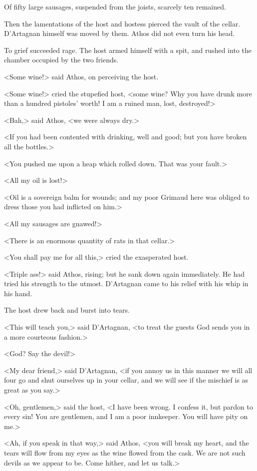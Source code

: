 Of fifty large sausages, suspended from the joists, scarcely ten remained. 

Then the lamentations of the host and hostess pierced the vault of the cellar. D'Artagnan himself was moved by them. Athos did not even turn his head. 

To grief succeeded rage. The host armed himself with a spit, and rushed into the chamber occupied by the two friends. 

<Some wine!> said Athos, on perceiving the host. 

<Some wine!> cried the stupefied host, <some wine? Why you have drunk more than a hundred pistoles' worth! I am a ruined man, lost, destroyed!> 

<Bah,> said Athos, <we were always dry.> 

<If you had been contented with drinking, well and good; but you have broken all the bottles.> 

<You pushed me upon a heap which rolled down. That was your fault.> 

<All my oil is lost!> 

<Oil is a sovereign balm for wounds; and my poor Grimaud here was obliged to dress those you had inflicted on him.> 

<All my sausages are gnawed!> 

<There is an enormous quantity of rats in that cellar.> 

<You shall pay me for all this,> cried the exasperated host. 

<Triple ass!> said Athos, rising; but he sank down again immediately. He had tried his strength to the utmost. D'Artagnan came to his relief with his whip in his hand. 

The host drew back and burst into tears. 

<This will teach you,> said D'Artagnan, <to treat the guests God sends you in a more courteous fashion.> 

<God? Say the devil!> 

<My dear friend,> said D'Artagnan, <if you annoy us in this manner we will all four go and shut ourselves up in your cellar, and we will see if the mischief is as great as you say.> 

<Oh, gentlemen,> said the host, <I have been wrong. I confess it, but pardon to every sin! You are gentlemen, and I am a poor innkeeper. You will have pity on me.> 

<Ah, if you speak in that way,> said Athos, <you will break my heart, and the tears will flow from my eyes as the wine flowed from the cask. We are not such devils as we appear to be. Come hither, and let us talk.> 

